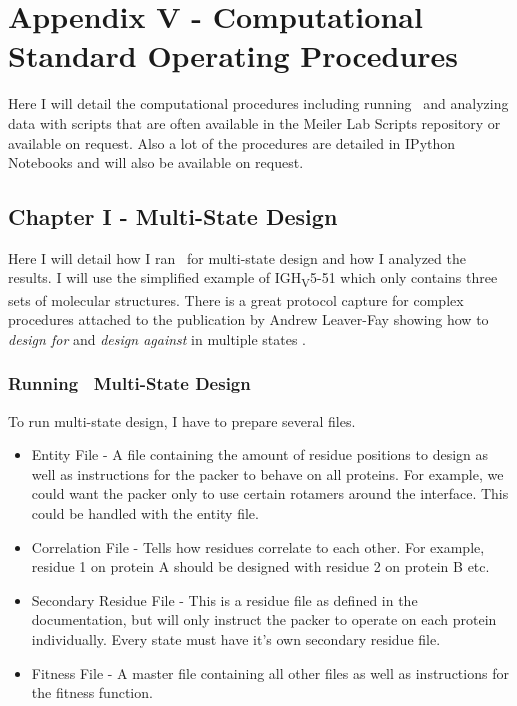 \section{Appendix V - Computational Standard Operating Procedures}
\label{sec:appenixV}
Here I will detail the computational procedures including running \rosetta~and analyzing data with scripts that are often available in the Meiler Lab Scripts repository or available on request. Also a lot of the procedures are detailed in IPython Notebooks and will also be available on request.

\subsection{Chapter I - Multi-State Design}
Here I will detail how I ran \rosettadesign~for multi-state design and how I analyzed the results. I will use the simplified example of IGH\textsubscript{V}5-51 which only contains three sets of molecular structures. There is a great protocol capture for complex procedures attached to the publication by Andrew Leaver-Fay showing how to \textit{design for} and \textit{design against} in multiple states \citep{LeaverFay:2011ji}.
\subsubsection{Running \rosetta~Multi-State Design}
To run multi-state design, I have to prepare several files.

\begin{itemize}
\item Entity File - A file containing the amount of residue positions to design as well as instructions for the packer to behave on all proteins. For example, we could want the packer only to use certain rotamers around the interface. This could be handled with the entity file.
\item Correlation File - Tells how residues correlate to each other. For example, residue 1 on protein A should be designed with residue 2 on protein B etc.
\item Secondary Residue File - This is a residue file as defined in the documentation, but will only instruct the packer to operate on each protein individually. Every state must have it's own secondary residue file.
\item Fitness File - A master file containing all other files as well as instructions for the fitness function.
\end{itemize}

